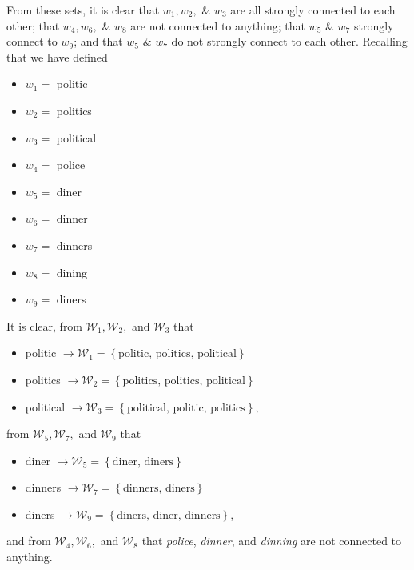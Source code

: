 \documentclass{article}[12pt]
\begin{document}
\begin{flushleft}
From these sets, it is clear that $w_1, w_2,$ \& $w_3$ are all strongly connected to each other; that $w_4, w_6,$ \& $w_8$ are not connected to anything; that $w_5$ \& $w_7$ strongly connect to $w_9$; and that $w_5$ \& $w_7$ do not strongly connect to each other. Recalling that we have defined

\begin{multicols}{3}
	\begin{itemize}
		\item $w_1 = $ politic
		\item $w_2 = $ politics
		\item $w_3 = $ political
		\item $w_4 = $ police
		\item $w_5 = $ diner
		\item $w_6 = $ dinner
		\item $w_7 = $ dinners
		\item $w_8 = $ dining
		\item $w_9 = $ diners
	\end{itemize}
\end{multicols}

It is clear, from $\mathcal{W}_1, \mathcal{W}_2,$ and $\mathcal{W}_3$ that

\begin{itemize}
	\item politic $\longrightarrow \mathcal{W}_1 = \left\{ \text{politic, politics, political} \right\}$
	\item politics $\longrightarrow \mathcal{W}_2 = \left\{ \text{politics, politics, political} \right\}$
	\item political $\longrightarrow \mathcal{W}_3 = \left\{ \text{political, politic, politics} \right\}$,
\end{itemize}

from $\mathcal{W}_5, \mathcal{W}_7,$ and $\mathcal{W}_9$ that

\begin{itemize}
	\item diner $\longrightarrow \mathcal{W}_5 = \left\{ \text{diner, diners} \right\}$
	\item dinners $\longrightarrow \mathcal{W}_7 = \left\{ \text{dinners, diners} \right\}$
	\item diners $\longrightarrow \mathcal{W}_9 = \left\{ \text{diners, diner, dinners} \right\}$,
\end{itemize}

and from $\mathcal{W}_4, \mathcal{W}_6,$ and $\mathcal{W}_8$ that \emph{police}, \emph{dinner}, and \emph{dinning} are not connected to anything. \newline


\end{flushleft}
\end{document}
